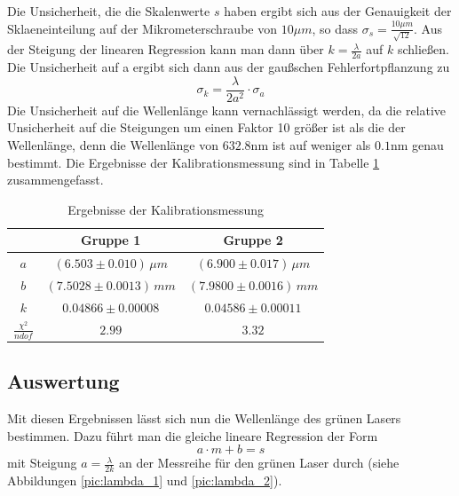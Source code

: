 \documentclass[a4paper, 11pt]{article}
\begin{document}
Die Unsicherheit, die die Skalenwerte $s$ haben ergibt sich aus der Genauigkeit der Sklaeneinteilung auf der Mikrometerschraube von $10 \mu m$, so dass $\sigma_s = \frac{10 \mu m }{\sqrt{12}}$.
Aus der Steigung der linearen Regression kann man dann über $k = \frac{\lambda}{2a}$ auf $k$ schließen.
Die Unsicherheit auf a ergibt sich dann aus der gaußschen Fehlerfortpflanzung zu 
\begin{equation*}
\sigma_k = \frac{\lambda}{2a^2} \cdot \sigma_a
\end{equation*}
Die Unsicherheit auf die 
Wellenlänge kann vernachlässigt werden, da die relative Unsicherheit auf die Steigungen um einen Faktor 10 größer ist als die der Wellenlänge, denn die Wellenlänge von $632.8$nm ist auf weniger als $0.1$nm genau bestimmt. Die Ergebnisse der Kalibrationsmessung sind in Tabelle \ref{table:Kalibration} zusammengefasst. 
\begin{table}[H]
	\renewcommand{\arraystretch}{1.5}
	\centering
	\begin{tabular}{|c|c|c|}
		\hline  	&	Gruppe 1	&	Gruppe 2  	\\
		\hline	$a$ &	$ (6.503 \pm 0.010) \,\mu m$		&	$ (6.900 \pm 0.017)\, \mu m $ \\
		\hline  $b$	&	$ (7.5028 \pm 0.0013)\, mm$		&	$ (7.9800 \pm 0.0016)\, mm$ \\
		\hline  $k$	&	$ 0.04866 \pm 0.00008 $		&	$ 0.04586 \pm 0.00011$ \\
		\hline $\frac{\chi^2}{ndof}$	&	$2.99$	&	$3.32$	\\
		\hline
	\end{tabular}
	\caption{Ergebnisse der Kalibrationsmessung}
	\label{table:Kalibration}
\end{table}

\subsection{Auswertung}
Mit diesen Ergebnissen lässt sich nun die Wellenlänge des grünen Lasers bestimmen. Dazu führt man die gleiche lineare Regression der Form 
\begin{equation}
a \cdot m + b = s
\end{equation} mit Steigung $ a = \frac{\lambda}{2 k} $ an der Messreihe für den grünen Laser durch (siehe Abbildungen \ref{pic:lambda_1} und \ref{pic:lambda_2}).
\end{document}
